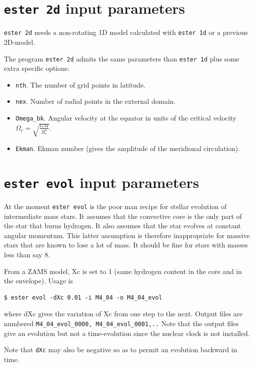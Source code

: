 \section{{\tt ester 2d} input parameters}

{\tt ester 2d} needs a non-rotating 1D model
calculated with {\tt ester 1d} or a previous 2D-model.

The program {\tt ester 2d} admits the same parameters than {\tt ester 1d}
plus some extra specific options:

\begin{itemize}
\item {\tt nth}. The number of grid points in latitude.
\item {\tt nex}. Number of radial points in the external domain.
\item {\tt Omega\_bk}. Angular velocity at the equator in units of the critical velocity
$\Omega_c=\sqrt{\frac{GM}{R_e^3}}$.
\item {\tt Ekman}. Ekman number (gives the amplitude of the meridional circulation).
\end{itemize}

\section{{\tt ester evol} input parameters}

At the moment {\tt ester evol} is the poor man recipe for stellar
evolution of intermediate mass stars. It assumes that the convective core
is the only part of the star that burns hydrogen. It also assumes that
the star evolves at constant angular momentum. This latter assumption
is therefore inappropriate for massive stars that are known to lose a
lot of mass. It should be fine for stars with masses less than say 8\msun.

From a ZAMS model, Xc is set to 1 (same hydrogen content in the core and in
the envelope). Usage is 

\begin{verbatim}
$ ester evol -dXc 0.01 -i M4_04 -o M4_04_evol
\end{verbatim}

\noindent where  dXc gives the variation of Xc from one step to the next. Output
files are numbered {\tt M4\_04\_evol\_0000, M4\_04\_evol\_0001,..} Note
that the output files give an evolution but not a time-evolution since
the nuclear clock is not installed.

Note that {\tt dXc} may also be negative so as to permit an evolution
backward in time.





